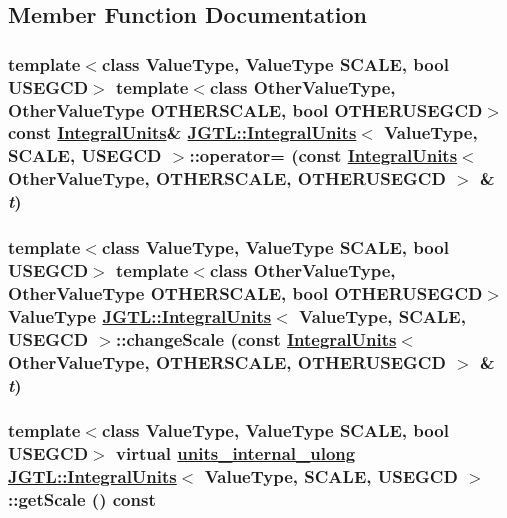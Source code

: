 \subsection{Member Function Documentation}
\hypertarget{class_j_g_t_l_1_1_integral_units_6aff5273f65110cf3bda1bea9d27c779}{
\subsubsection[operator=]{\setlength{\rightskip}{0pt plus 5cm}template$<$class Value\-Type, Value\-Type SCALE, bool USEGCD$>$ template$<$class Other\-Value\-Type, Other\-Value\-Type OTHERSCALE, bool OTHERUSEGCD$>$ const \hyperlink{class_j_g_t_l_1_1_integral_units}{Integral\-Units}\& \hyperlink{class_j_g_t_l_1_1_integral_units}{JGTL::Integral\-Units}$<$ Value\-Type, SCALE, USEGCD $>$::operator= (const \hyperlink{class_j_g_t_l_1_1_integral_units}{Integral\-Units}$<$ Other\-Value\-Type, OTHERSCALE, OTHERUSEGCD $>$ \& {\em t})}}
\label{class_j_g_t_l_1_1_integral_units_6aff5273f65110cf3bda1bea9d27c779}


\hypertarget{class_j_g_t_l_1_1_integral_units_44144b6bf0109bf22d742c52fefaa63f}{
\subsubsection[changeScale]{\setlength{\rightskip}{0pt plus 5cm}template$<$class Value\-Type, Value\-Type SCALE, bool USEGCD$>$ template$<$class Other\-Value\-Type, Other\-Value\-Type OTHERSCALE, bool OTHERUSEGCD$>$ Value\-Type \hyperlink{class_j_g_t_l_1_1_integral_units}{JGTL::Integral\-Units}$<$ Value\-Type, SCALE, USEGCD $>$::change\-Scale (const \hyperlink{class_j_g_t_l_1_1_integral_units}{Integral\-Units}$<$ Other\-Value\-Type, OTHERSCALE, OTHERUSEGCD $>$ \& {\em t})}}
\label{class_j_g_t_l_1_1_integral_units_44144b6bf0109bf22d742c52fefaa63f}


\hypertarget{class_j_g_t_l_1_1_integral_units_c993e88b13af685bbd5a30975a0cfdc9}{
\subsubsection[getScale]{\setlength{\rightskip}{0pt plus 5cm}template$<$class Value\-Type, Value\-Type SCALE, bool USEGCD$>$ virtual \hyperlink{namespace_j_g_t_l_1924d6fd42e2d9661bc0b5a5063b99b3}{units\_\-internal\_\-ulong} \hyperlink{class_j_g_t_l_1_1_integral_units}{JGTL::Integral\-Units}$<$ Value\-Type, SCALE, USEGCD $>$::get\-Scale () const}}
\label{class_j_g_t_l_1_1_integral_units_c993e88b13af685bbd5a30975a0cfdc9}


